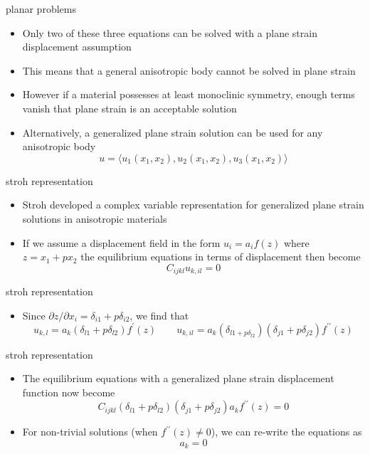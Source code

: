 \documentclass[
  letterpaper,
  ignorenonframetext,
  aspectratio=43,
  handout,
  12pt]{beamer}
\providecommand{\tightlist}{%
  \setlength{\itemsep}{0pt}\setlength{\parskip}{0pt}}
\providecommand{\tightlist}{%
\setlength{\itemsep}{0pt}\setlength{\parskip}{0pt}}
\begin{document}
\begin{frame}{planar problems}
\protect\hypertarget{planar-problems-1}{}
\begin{itemize}
\tightlist
\item
  Only two of these three equations can be solved with a plane strain
  displacement assumption
\item
  This means that a general anisotropic body cannot be solved in plane
  strain
\item
  However if a material possesses at least monoclinic symmetry, enough
  terms vanish that plane strain is an acceptable solution
\item
  Alternatively, a generalized plane strain solution can be used for any
  anisotropic body
  \[u = \langle u_1(x_1,x_2), u_2(x_1,x_2), u_3(x_1,x_2) \rangle\]
\end{itemize}
\end{frame}

\begin{frame}{stroh representation}
\protect\hypertarget{stroh-representation}{}
\begin{itemize}
\tightlist
\item
  Stroh developed a complex variable representation for generalized
  plane strain solutions in anisotropic materials
\item
  If we assume a displacement field in the form \(u_i = a_i f(z)\) where
  \(z = x_1 + px_2\) the equilibrium equations in terms of displacement
  then become \[C_{ijkl} u_{k,il} = 0\]
\end{itemize}
\end{frame}

\begin{frame}{stroh representation}
\protect\hypertarget{stroh-representation-1}{}
\begin{itemize}
\tightlist
\item
  Since \(\partial z/ \partial x_i = \delta_{i1} + p \delta_{i2}\), we
  find that
  \[u_{k,l} = a_k (\delta_{l1} + p \delta_{l2})f^\prime(z) \qquad u_{k,il} = a_k(\delta_{l1 + p\delta_{l2}})(\delta_{j1} + p\delta_{j2})f^{\prime\prime}(z)\]
\end{itemize}
\end{frame}

\begin{frame}{stroh representation}
\protect\hypertarget{stroh-representation-2}{}
\begin{itemize}
\item
  The equilibrium equations with a generalized plane strain displacement
  function now become
  \[C_{ijkl}(\delta_{l1} + p\delta_{l2})(\delta_{j1} + p\delta_{j2})a_kf^{\prime \prime}(z) = 0\]
\item
  For non-trivial solutions (when \(f^{\prime \prime}(z) \ne 0\)), we
  can re-write the equations as \[a_k = 0\]
\end{itemize}
\end{frame}
\end{document}
